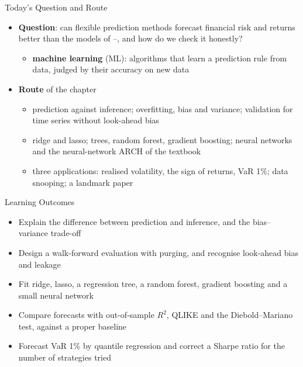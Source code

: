 \begin{frame}{Today's Question and Route}
\itemsize{\small}
\begin{itemize}
    \item \textbf{Question}: can flexible prediction methods forecast financial risk and returns better than the models of --, and how do we check it honestly?
    \begin{itemize}
        \item \textbf{machine learning} (ML): algorithms that learn a prediction rule from data, judged by their accuracy on new data
    \end{itemize}
    \item \textbf{Route} of the chapter
    \begin{itemize}
        \item prediction against inference; overfitting, bias and variance; validation for time series without look-ahead bias
        \item ridge and lasso; trees, random forest, gradient boosting; neural networks and the neural-network ARCH of the textbook
        \item three applications: realised volatility, the sign of returns, VaR 1\%; data snooping; a landmark paper
    \end{itemize}
\end{itemize}
\end{frame}

\begin{frame}{Learning Outcomes}
\itemsize{\small}
\begin{itemize}
    \item Explain the difference between prediction and inference, and the bias--variance trade-off
    \item Design a walk-forward evaluation with purging, and recognise look-ahead bias and leakage
    \item Fit ridge, lasso, a regression tree, a random forest, gradient boosting and a small neural network
    \item Compare forecasts with out-of-sample $R^2$, QLIKE and the Diebold--Mariano test, against a proper baseline
    \item Forecast VaR 1\% by quantile regression and correct a Sharpe ratio for the number of strategies tried
\end{itemize}
\end{frame}

